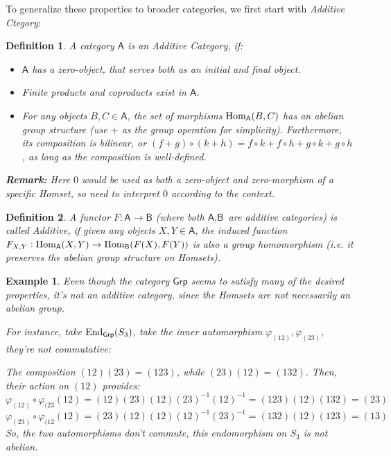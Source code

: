 \documentclass[x11names,reqno,12pt]{extarticle}
\newtheorem{defn}{Definition}
\newtheorem{exm}{Example}
\newcommand{\Hom}{\textmd{Hom}}
\newcommand{\End}{\textmd{End}}
\newcommand{\cat}[1]{\textsf{#1}}
\begin{document}
To generalize these properties to broader categories, we first start with \emph{Additive Ctegory}:
\begin{defn}
    A category $\cat{A}$ is an \emph{Additive Category}, if:
    \begin{itemize}
        \item[1.] $\cat{A}$ has a zero-object, that serves both as an initial and final object.
        \item[2.] Finite products and coproducts exist in $\cat{A}$.
        \item[3.] For any objects $B,C\in\cat{A}$, the set of morphisms $\Hom_\cat{A}(B,C)$ has an abelian group structure (use $+$ as the group operation for simplicity). Furthermore, its composition is bilinear, or $(f+g)\circ (k+h)=f\circ k+f\circ h+g\circ k+g\circ h$, as long as the composition is well-defined.
    \end{itemize}
    \textbf{Remark:}
        Here $0$ would be used as both a zero-object and zero-morphism of a specific Homset, so need to interpret $0$ according to the context.
\end{defn}

\begin{defn}
    A functor $F:\cat{A}\rightarrow\cat{B}$ (where both $\cat{A},\cat{B}$ are additive categories) is called \emph{Additive}, if given any objects $X,Y\in \cat{A}$, the induced function $F_{X,Y}:\Hom_\cat{A}(X,Y)\rightarrow \Hom_\cat{B}(F(X),F(Y))$ is also a group homomorphism (i.e. it preserves the abelian group structure on Homsets).
\end{defn}

\begin{exm}
    Even though the category $\cat{Grp}$ seems to satisfy many of the desired properties, it's not an additive category, since the Homsets are not necessarily an abelian group.

    For instance, take $\End_\cat{Grp}(S_3)$, take the inner automorphism $\varphi_{(12)},\varphi_{(23)}$, they're not commutative:

    The composition $(12)(23) = (123)$, while $(23)(12) = (132)$. Then, their action on $(12)$ provides:
    $$\varphi_{(12)}\circ \varphi_{(23}(12) = (12)(23)(12)(23)^{-1}(12)^{-1} = (123)(12)(132)=(23)$$
    $$\varphi_{(23)}\circ \varphi_{(12}(12) = (23)(12)(12)(12)^{-1}(23)^{-1} = (132)(12)(123) = (13)$$
    So, the two automorphisms don't commute, this endomorphism on $S_3$ is not abelian.
\end{exm}
\end{document}
